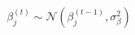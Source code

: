 \documentclass[preview]{standalone}
\begin{document}
\begin{align*}
\beta_j^{(t)} \sim \mathcal{N}(\beta_j^{(t-1)}, \sigma_\beta^2)
\end{align*}
\end{document}
